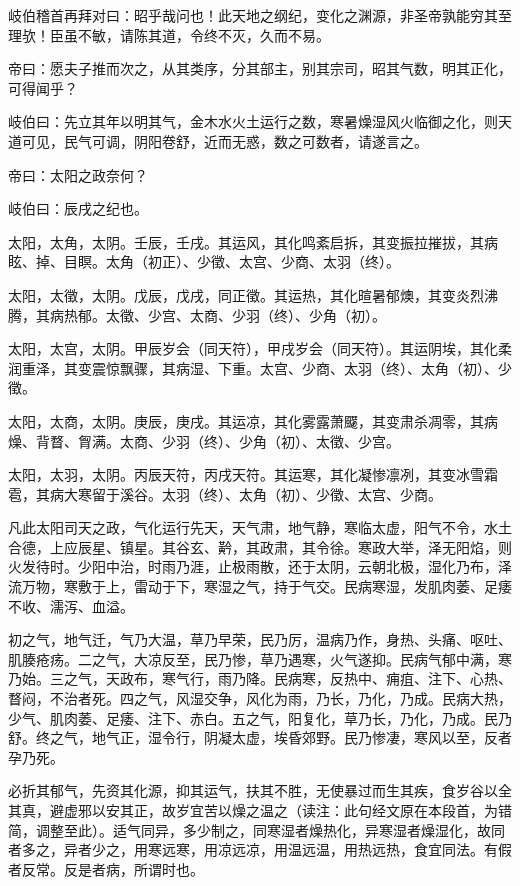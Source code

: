 \documentclass{article}%
\begin{document}
岐伯稽首再拜对曰：昭乎哉问也！此天地之纲纪，变化之渊源，非圣帝孰能穷其至理欤！臣虽不敏，请陈其道，令终不灭，久而不易。

帝曰：愿夫子推而次之，从其类序，分其部主，别其宗司，昭其气数，明其正化，可得闻乎？

岐伯曰：先立其年以明其气，金木水火土运行之数，寒暑燥湿风火临御之化，则天道可见，民气可调，阴阳卷舒，近而无惑，数之可数者，请遂言之。

帝曰：太阳之政奈何？

岐伯曰：辰戌之纪也。

太阳，太角，太阴。壬辰，壬戌。其运风，其化鸣紊启拆，其变振拉摧拔，其病眩、掉、目瞑。太角（初正）、少徵、太宫、少商、太羽（终）。

太阳，太徵，太阴。戊辰，戊戌，同正徵。其运热，其化暄暑郁燠，其变炎烈沸腾，其病热郁。太徵、少宫、太商、少羽（终）、少角（初）。

太阳，太宫，太阴。甲辰岁会（同天符），甲戌岁会（同天符）。其运阴埃，其化柔润重泽，其变震惊飘骤，其病湿、下重。太宫、少商、太羽（终）、太角（初）、少徵。

太阳，太商，太阴。庚辰，庚戌。其运凉，其化雾露萧飋，其变肃杀凋零，其病燥、背瞀、胷满。太商、少羽（终）、少角（初）、太徵、少宫。

太阳，太羽，太阴。丙辰天符，丙戌天符。其运寒，其化凝惨凛冽，其变冰雪霜雹，其病大寒留于溪谷。太羽（终）、太角（初）、少徵、太宫、少商。

凡此太阳司天之政，气化运行先天，天气肃，地气静，寒临太虚，阳气不令，水土合德，上应辰星、镇星。其谷玄、黅，其政肃，其令徐。寒政大举，泽无阳焰，则火发待时。少阳中治，时雨乃涯，止极雨散，还于太阴，云朝北极，湿化乃布，泽流万物，寒敷于上，雷动于下，寒湿之气，持于气交。民病寒湿，发肌肉萎、足痿不收、濡泻、血溢。

初之气，地气迁，气乃大温，草乃早荣，民乃厉，温病乃作，身热、头痛、呕吐、肌腠疮疡。二之气，大凉反至，民乃惨，草乃遇寒，火气遂抑。民病气郁中满，寒乃始。三之气，天政布，寒气行，雨乃降。民病寒，反热中、痈疽、注下、心热、瞀闷，不治者死。四之气，风湿交争，风化为雨，乃长，乃化，乃成。民病大热，少气、肌肉萎、足痿、注下、赤白。五之气，阳复化，草乃长，乃化，乃成。民乃舒。终之气，地气正，湿令行，阴凝太虚，埃昏郊野。民乃惨凄，寒风以至，反者孕乃死。

必折其郁气，先资其化源，抑其运气，扶其不胜，无使暴过而生其疾，食岁谷以全其真，避虚邪以安其正，故岁宜苦以燥之温之（读注：此句经文原在本段首，为错简，调整至此）。适气同异，多少制之，同寒湿者燥热化，异寒湿者燥湿化，故同者多之，异者少之，用寒远寒，用凉远凉，用温远温，用热远热，食宜同法。有假者反常。反是者病，所谓时也。
\end{document}
